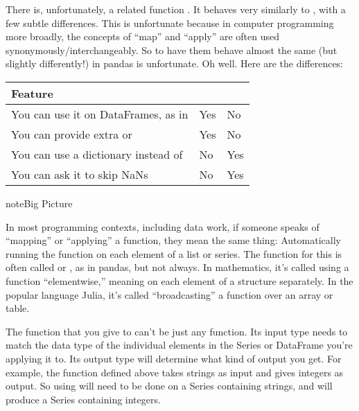 \documentclass[letterpaper,10pt,english]{sphinxmanual}
\begin{document}
There is, unfortunately, a related function .  It behaves very similarly to , with a few subtle differences.  This is unfortunate because in computer programming more broadly, the concepts of “map” and “apply” are often used synonymously/interchangeably.  So to have them behave almost the same (but slightly differently!) in pandas is unfortunate.  Oh well.  Here are the differences:


\begin{savenotes}\sphinxattablestart
\centering
\begin{tabulary}{\linewidth}[t]{|T|T|T|}
\hline
\sphinxstyletheadfamily 
Feature
&\sphinxstyletheadfamily 
{}
&\sphinxstyletheadfamily 
{}
\\
\hline
You can use it on DataFrames, as in 
&
Yes
&
No
\\
\hline
You can provide extra  or 
&
Yes
&
No
\\
\hline
You can use a dictionary instead of 
&
No
&
Yes
\\
\hline
You can ask it to skip NaNs
&
No
&
Yes
\\
\hline
\end{tabulary}
\par
\sphinxattableend\end{savenotes}

\begin{sphinxadmonition}{note}{Big Picture}

In most programming contexts, including data work, if someone speaks of “mapping” or “applying” a function, they mean the same thing:  Automatically running the function on each element of a list or series.  The function for this is often called  or , as in pandas, but not always.  In mathematics, it’s called using a function “elementwise,” meaning on each element of a structure separately.  In the popular language Julia, it’s called “broadcasting” a function over an array or table.
\end{sphinxadmonition}

The function that you give to  can’t be just any function.  Its input type needs to match the data type of the individual elements in the Series or DataFrame you’re applying it to.  Its output type will determine what kind of output you get.  For example, the  function defined above takes strings as input and gives integers as output.  So using  will need to be done on a Series containing strings, and will produce a Series containing integers.
\end{document}
